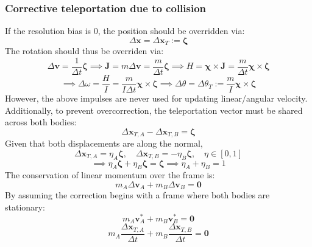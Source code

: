 \documentclass[10pt]{report}
\begin{document}
\subsubsection{Corrective teleportation due to collision}
If the resolution bias is 0, the position should be overridden via:
\begin{equation}\Delta\boldsymbol{x}=\Delta\boldsymbol{x}_T:=\boldsymbol{\zeta}\end{equation}
 The rotation should thus be overriden via:
\begin{equation}\Delta\boldsymbol{v}=\frac{1}{\Delta t}\boldsymbol{\zeta}\implies \boldsymbol{J}=m\Delta\boldsymbol{v}=\frac{m}{\Delta t}\boldsymbol{\zeta}\implies H=\boldsymbol{\chi}\times\boldsymbol{J}=\frac{m}{\Delta t}\boldsymbol{\chi}\times\boldsymbol{\zeta}\end{equation}
\begin{equation}\implies\Delta\omega=\frac{H}{I}=\frac{m}{I\Delta t}\boldsymbol{\chi}\times\boldsymbol{\zeta}\implies\Delta\theta=\Delta\theta_T:=\frac{m}{I}\boldsymbol{\chi}\times\boldsymbol{\zeta}\end{equation}
However, the above impulses are never used for updating linear/angular velocity. Additionally, to prevent overcorrection, the teleportation vector must be shared across both bodies:
\begin{equation}\Delta\boldsymbol{x}_{T,A}-\Delta\boldsymbol{x}_{T,B}=\boldsymbol{\zeta}\end{equation}
Given that both displacements are along the normal,
\begin{equation}\Delta\boldsymbol{x}_{T,A}=\eta_A\boldsymbol{\zeta},\quad\Delta\boldsymbol{x}_{T,B}=-\eta_B\boldsymbol{\zeta},\quad\eta\in[0,1]\end{equation}
\begin{equation}\implies\eta_A\boldsymbol{\zeta}+\eta_B\boldsymbol{\zeta}=\boldsymbol{\zeta}\implies\eta_A+\eta_B=1\end{equation}
The conservation of linear momentum over the frame is:
\begin{equation}m_A\Delta\boldsymbol{v}_A+m_B\Delta\boldsymbol{v}_B=\boldsymbol{0}\end{equation}
By assuming the correction begins with a frame where both bodies are stationary:
\begin{equation}m_A\boldsymbol{v}_A^*+m_B\boldsymbol{v}_B^*=\boldsymbol{0}\end{equation}
\begin{equation}m_A\frac{\Delta\boldsymbol{x}_{T,A}}{\Delta t}+m_B\frac{\Delta\boldsymbol{x}_{T,B}}{\Delta t}=\boldsymbol{0}\end{equation}
\end{document}

